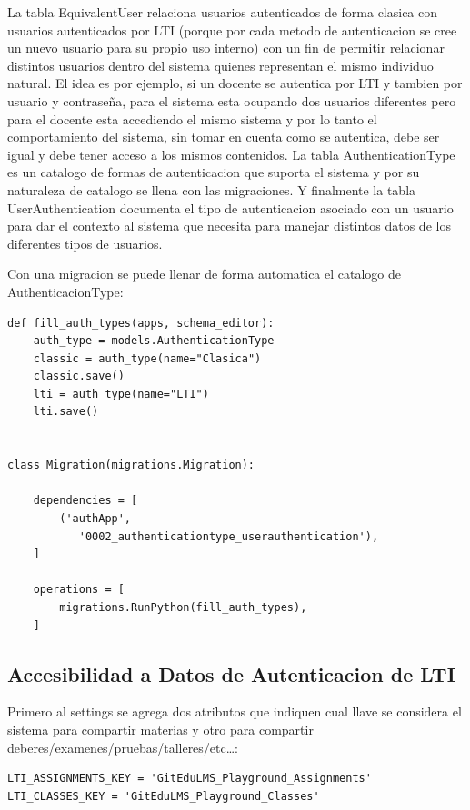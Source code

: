 \lstset{language=Bash}
La tabla EquivalentUser relaciona usuarios autenticados de forma clasica con usuarios autenticados por LTI (porque por cada metodo de autenticacion se cree un nuevo usuario para su propio uso interno) con un fin de permitir relacionar distintos usuarios dentro del sistema quienes representan el mismo individuo natural. El idea es por ejemplo, si un docente se autentica por LTI y tambien por usuario y contraseña, para el sistema esta ocupando dos usuarios diferentes pero para el docente esta accediendo el mismo sistema y por lo tanto el comportamiento del sistema, sin tomar en cuenta como se autentica, debe ser igual y debe tener acceso a los mismos contenidos. La tabla AuthenticationType es un catalogo de formas de autenticacion que suporta el sistema y por su naturaleza de catalogo se llena con las migraciones. Y finalmente la tabla UserAuthentication documenta el tipo de autenticacion asociado con un usuario para dar el contexto al sistema que necesita para manejar distintos datos de los diferentes tipos de usuarios.

Con una migracion se puede llenar de forma automatica el catalogo de AuthenticacionType:
\lstset{language=Python}
\begin{lstlisting}
def fill_auth_types(apps, schema_editor):
    auth_type = models.AuthenticationType
    classic = auth_type(name="Clasica")
    classic.save()
    lti = auth_type(name="LTI")
    lti.save()


class Migration(migrations.Migration):

    dependencies = [
        ('authApp',
           '0002_authenticationtype_userauthentication'),
    ]

    operations = [
        migrations.RunPython(fill_auth_types),
    ]
\end{lstlisting}
\lstset{language=Bash}

\subsection{Accesibilidad a Datos de Autenticacion de LTI}
Primero al settings se agrega dos atributos que indiquen cual llave se considera el sistema para compartir materias y otro para compartir deberes/examenes/pruebas/talleres/etc\ldots{}:
\lstset{language=Python}
\begin{lstlisting}
LTI_ASSIGNMENTS_KEY = 'GitEduLMS_Playground_Assignments'
LTI_CLASSES_KEY = 'GitEduLMS_Playground_Classes'
\end{lstlisting}
\lstset{language=Bash}

